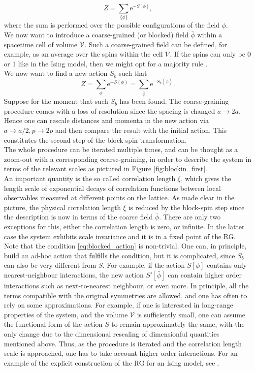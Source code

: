 \begin{equation*}
    Z=\sum_{\{\phi\}} \mathrm{e}^{-S[\phi]},
\end{equation*}
where the sum is performed over the possible configurations of the field $\phi$. \\
We now want to introduce a coarse-grained (or blocked) field $\bar\phi$ within a spacetime cell of volume $\mathcal{V}$. Such a coarse-grained field can be defined, for example, as an average over the spins within the cell $\mathcal{V}$. If the spins can only be $0$ or $1$ like in the Ising model, then we might opt for a majority rule \cite{cardy_1996}.\\
We now want to find a new action $S_b$ such that 
\begin{equation}
    Z=\sum_{\phi} \mathrm{e}^{-S(\phi)}= \sum_{\bar\phi} \mathrm{e}^{-S_b\left(\bar\phi\right)}.
    \label{eq:blocked_action}
\end{equation}
Suppose for the moment that such $S_b$ has been found. The coarse-graining procedure comes with a loss of resolution since the spacing is changed $a \to 2a$. Hence one can rescale distances and momenta in the new action via $a \to a/2, p \to 2p$ and then compare the result with the initial action. This constitutes the second step of the block-spin transformation. \\
The whole procedure can be iterated multiple times, and can be thought as a zoom-out with a corresponding coarse-graining, in order to describe the system in terms of the relevant scales as pictured in Figure \ref{fig:blockin_first}.\\
An important quantity is the so called correlation length $\xi$, which gives the length scale of exponential decays of correlation functions between local observables measured
at different points on the lattice. As made clear in the picture, the physical correlation length $\xi$ is reduced by the block-spin step since the description is now in terms of the coarse field $\bar\phi$. 
There are only two exceptions for this, either the correlation length is zero, or infinite. In the latter case the system exhibits scale invariance and it is in a fixed point of the RG. \\
Note that the condition \eqref{eq:blocked_action} is non-trivial. One can, in principle, build an ad-hoc action that fulfills the condition, but it is complicated, since $S_b$ can also be very different from $S$. For example, if the action $S[\phi]$ contains only nearest-neighbour interactions, the new action $S'[\bar\phi]$ can contain higher order interactions such as next-to-nearest neighbour, or even more.  In principle, all the terms compatible with the original symmetries are allowed, and one has often to rely on some approximations. For example, if one is interested in long-range properties of the system, and the volume $\mathcal{V}$ is sufficiently small, one can assume 
the functional form of the action $S$ to remain approximately the same, with the only change due to the dimensional rescaling of dimensionful quantities mentioned above. Thus, as the procedure is iterated and the correlation length scale is approached, one has to take account higher order interactions. For an example of the explicit construction of the RG for an Ising model, see \cite{cardy_1996}.

